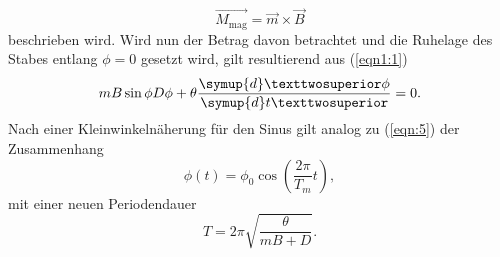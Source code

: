 \begin{equation}
  \vec{M_{\text{mag}}} = \vec{m} \times \vec{B} \label{eqn:10}
\end{equation}
beschrieben wird.
Wird nun der Betrag davon betrachtet und die Ruhelage des Stabes entlang $\phi = 0$ gesetzt wird, gilt resultierend aus (\ref{eqn1:1})
\begin{equation}
      mB\sin{\phi} D \phi + \theta \frac{\symup{d}²\phi}{\symup{d}t²} = 0.
\end{equation}
Nach einer Kleinwinkelnäherung für den Sinus gilt analog zu (\ref{eqn:5}) der Zusammenhang
\begin{equation}
  \phi (t) = \phi_0\cos\left(\frac{2\pi}{T_m}t\right), \label{eqn:11}
\end{equation}
mit einer neuen Periodendauer
\begin{equation}
  T = 2\pi\sqrt{\frac{\theta}{mB+D}}. \label{eqn:12}
\end{equation}
